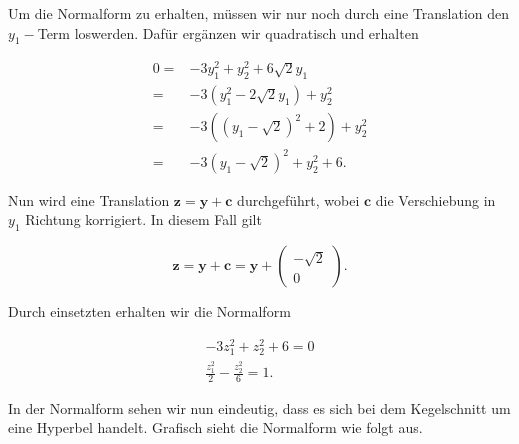 Um die Normalform zu erhalten, müssen wir nur noch durch eine Translation den \( y_1-\)Term loswerden. Dafür ergänzen wir quadratisch und erhalten

\begin{equation*}
    \begin{aligned}
        0 = & -3y_1^2 + y_2^2 + 6 \sqrt{2} y_1 \\[0.5em]
        = & -3 \left( y_1^2 - 2\sqrt{2} y_1 \right) + y_2^2 \\[0.5em]
        = & -3 \left( \left(y_1 - \sqrt{2}\right)^2 + 2 \right) + y_2^2 \\[0.5em]
        = & -3 \left(y_1 - \sqrt{2}\right)^2 + y_2^2 + 6.
    \end{aligned}
\end{equation*}

Nun wird eine Translation \( \mathbf{z} = \mathbf{y} + \mathbf{c} \) durchgeführt, wobei \( \mathbf{c} \) die Verschiebung in \( y_1 \) Richtung korrigiert. In diesem Fall gilt

\begin{equation*}
    \mathbf{z} = \mathbf{y} + \mathbf{c} = \mathbf{y} + \begin{pmatrix} - \sqrt{2} \\ 0 \end{pmatrix}.
\end{equation*}

Durch einsetzten erhalten wir die Normalform

\begin{equation*}
    \begin{aligned}
        -3z_1^2 + z_2^2 + 6 = 0 \\[0.5em]
        \frac{z_1^2}{2} - \frac{z_2^2}{6} = 1.
    \end{aligned}
\end{equation*}

In der Normalform sehen wir nun eindeutig, dass es sich bei dem Kegelschnitt um eine Hyperbel handelt. Grafisch sieht die Normalform wie folgt aus.


